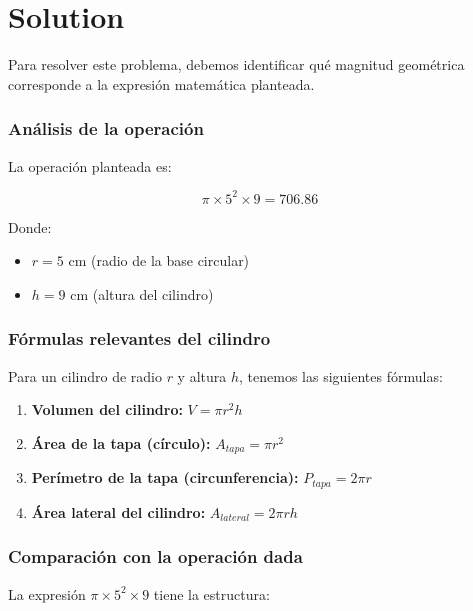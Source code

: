 \documentclass[
]{article}
\providecommand{\tightlist}{%
  \setlength{\itemsep}{0pt}\setlength{\parskip}{0pt}}
\begin{document}
\section{Solution}\label{solution}

Para resolver este problema, debemos identificar qué magnitud geométrica
corresponde a la expresión matemática planteada.

\subsubsection{Análisis de la
operación}\label{anuxe1lisis-de-la-operaciuxf3n}

La operación planteada es:

\[\pi \times 5^2 \times 9 = 706.86\]

Donde:

\begin{itemize}
\tightlist
\item
  \(r = 5\) cm (radio de la base circular)
\item
  \(h = 9\) cm (altura del cilindro)
\end{itemize}

\subsubsection{Fórmulas relevantes del
cilindro}\label{fuxf3rmulas-relevantes-del-cilindro}

Para un cilindro de radio \(r\) y altura \(h\), tenemos las siguientes
fórmulas:

\begin{enumerate}
\def\labelenumi{\arabic{enumi}.}
\tightlist
\item
  \textbf{Volumen del cilindro:} \(V = \pi r^2 h\)
\item
  \textbf{Área de la tapa (círculo):} \(A_{tapa} = \pi r^2\)
\item
  \textbf{Perímetro de la tapa (circunferencia):} \(P_{tapa} = 2\pi r\)
\item
  \textbf{Área lateral del cilindro:} \(A_{lateral} = 2\pi r h\)
\end{enumerate}

\subsubsection{Comparación con la operación
dada}\label{comparaciuxf3n-con-la-operaciuxf3n-dada}

La expresión \(\pi \times 5^2 \times 9\) tiene la estructura:
\end{document}
